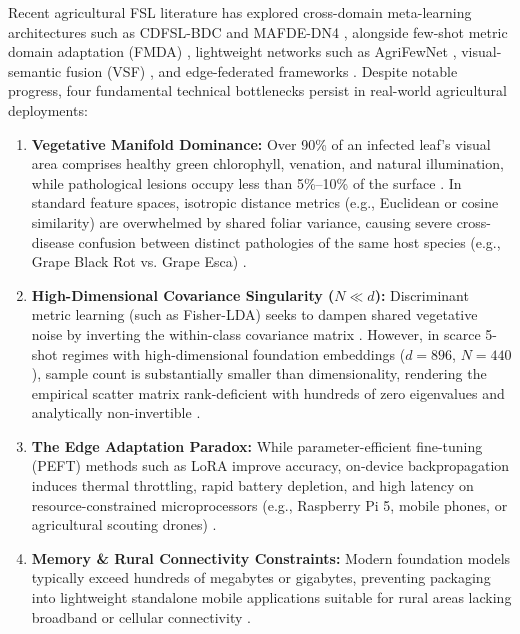 \documentclass[a4paper,fleqn,nologo]{cas-dc}
\begin{document}
Recent agricultural FSL literature has explored cross-domain meta-learning architectures such as CDFSL-BDC \cite{yang2024laboratory} and MAFDE-DN4 \cite{zhao2024mafde}, alongside few-shot metric domain adaptation (FMDA) \cite{kudo2025few}, lightweight networks such as AgriFewNet \cite{babu2025agrifewnet}, visual-semantic fusion (VSF) \cite{zhou2026vsf}, and edge-federated frameworks \cite{sharif2026real}. Despite notable progress, four fundamental technical bottlenecks persist in real-world agricultural deployments:
\begin{enumerate}
    \item \textbf{Vegetative Manifold Dominance:} Over 90\% of an infected leaf's visual area comprises healthy green chlorophyll, venation, and natural illumination, while pathological lesions occupy less than 5\%--10\% of the surface \cite{shoaib2023advanced}. In standard feature spaces, isotropic distance metrics (e.g., Euclidean or cosine similarity) are overwhelmed by shared foliar variance, causing severe cross-disease confusion between distinct pathologies of the same host species (e.g., Grape Black Rot vs. Grape Esca) \cite{zhou2026vsf}.
    \item \textbf{High-Dimensional Covariance Singularity ($N \ll d$):} Discriminant metric learning (such as Fisher-LDA) seeks to dampen shared vegetative noise by inverting the within-class covariance matrix \cite{fisher1936use}. However, in scarce 5-shot regimes with high-dimensional foundation embeddings ($d=896$, $N=440$), sample count is substantially smaller than dimensionality, rendering the empirical scatter matrix rank-deficient with hundreds of zero eigenvalues and analytically non-invertible \cite{ledoit2004well}.
    \item \textbf{The Edge Adaptation Paradox:} While parameter-efficient fine-tuning (PEFT) methods such as LoRA \cite{hu2022lora} improve accuracy, on-device backpropagation induces thermal throttling, rapid battery depletion, and high latency on resource-constrained microprocessors (e.g., Raspberry Pi 5, mobile phones, or agricultural scouting drones) \cite{zhao2026lightweight}.
    \item \textbf{Memory \& Rural Connectivity Constraints:} Modern foundation models typically exceed hundreds of megabytes or gigabytes, preventing packaging into lightweight standalone mobile applications suitable for rural areas lacking broadband or cellular connectivity \cite{zhao2026lightweight, sharif2026real}.
\end{enumerate}
\end{document}
